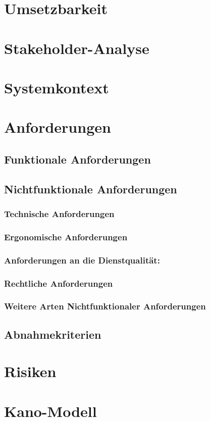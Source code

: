 \documentclass[a4paper, 12pp]{article}
\begin{document}
\section{Umsetzbarkeit}
\section{Stakeholder-Analyse}
\section{Systemkontext}
\section{Anforderungen}
\subsection{Funktionale Anforderungen}
\subsection{Nichtfunktionale Anforderungen}
\subsubsection{Technische Anforderungen}
\subsubsection{Ergonomische Anforderungen}
\subsubsection{Anforderungen an die Dienstqualität:}
\subsubsection{Rechtliche Anforderungen}
\subsubsection{Weitere Arten Nichtfunktionaler Anforderungen}
\subsection{Abnahmekriterien}
\newpage
\section{Risiken}
\section{Kano-Modell}
\end{document}
